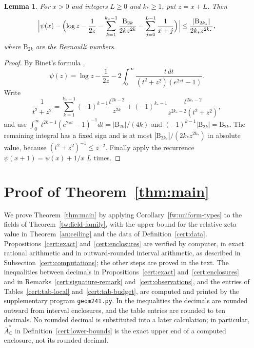 \documentclass[11pt]{amsart}
\numberwithin{equation}{section}
\newtheorem{lemma}[equation]{Lemma}
\theoremstyle{definition}
\theoremstyle{remark}
\newcommand{\C}{\mathbb C}
\begin{document}
\begin{lemma}\label{pf:digamma}
For $x>0$ and integers $L\ge0$ and $k_*\ge1$, put $z=x+L$. Then
\[
 \Bigl|\psi(x)-\Bigl(\log z-\frac1{2z}
 -\sum_{k=1}^{k_*-1}\frac{\mathrm B_{2k}}{2kz^{2k}}
 -\sum_{j=0}^{L-1}\frac1{x+j}\Bigr)\Bigr|
 \le\frac{|\mathrm B_{2k_*}|}{2k_*z^{2k_*}},
\]
where $\mathrm B_{2k}$ are the Bernoulli numbers.
\end{lemma}

\begin{proof}
By Binet's formula \cite[Equation~(5.9.15)]{DLMF},
\[
 \psi(z)=\log z-\frac1{2z}
 -2\int_0^\infty\frac{t\,dt}{(t^2+z^2)(e^{2\pi t}-1)} .
\]
Write
\[
 \frac1{t^2+z^2}=\sum_{k=1}^{k_*-1}(-1)^{k-1}\frac{t^{2k-2}}{z^{2k}}
 +(-1)^{k_*-1}\frac{t^{2k_*-2}}{z^{2k_*-2}(t^2+z^2)},
\]
and use $\int_0^\infty t^{2k-1}(e^{2\pi t}-1)^{-1}dt=|\mathrm B_{2k}|/(4k)$ and
$(-1)^{k-1}|\mathrm B_{2k}|=\mathrm B_{2k}$. The remaining integral has a fixed sign and
is at most $|\mathrm B_{2k_*}|/(2k_*z^{2k_*})$ in absolute value, because
$(t^2+z^2)^{-1}\le z^{-2}$. Finally apply the recurrence
$\psi(x+1)=\psi(x)+1/x$ $L$ times.
\end{proof}
\section{Proof of Theorem~\ref{thm:main}}
\label{sec:certificate}

We prove Theorem~\ref{thm:main} by applying
Corollary~\ref{fw:uniform-types} to the fields of
Theorem~\ref{tw:field-family}, with the upper bound for the relative
zeta value in Theorem~\ref{an:ceiling} and the data of
Definition~\ref{cert:data}. Propositions~\ref{cert:exact}
and~\ref{cert:enclosures} are verified by computer, in exact rational
arithmetic and in outward-rounded interval arithmetic, as described in
Subsection~\ref{cert:computations}; the other steps are proved in the
text. The inequalities between decimals in
Propositions~\ref{cert:exact} and~\ref{cert:enclosures} and in
Remarks~\ref{cert:signature-remark} and~\ref{cert:observations}, and
the entries of Tables~\ref{cert:tab-local} and~\ref{cert:tab-budget},
are computed and printed by the supplementary program
\texttt{geom241.py}. In the inequalities the decimals are rounded
outward from interval enclosures, and the table entries are rounded to
ten decimals. No rounded decimal is substituted into a later
calculation; in particular, $\bar A_\C^*$ in
Definition~\ref{cert:lower-bounds} is the exact upper end of a computed
enclosure, not its rounded decimal.
\end{document}
